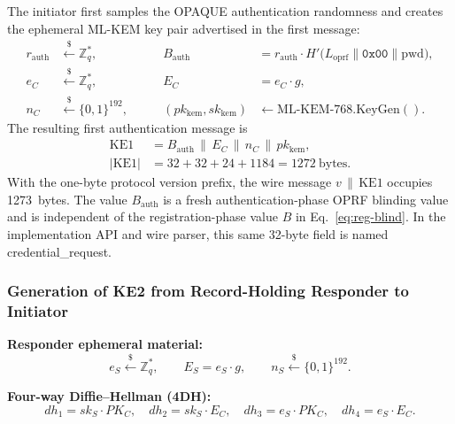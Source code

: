\documentclass[preprint,12pt]{elsarticle}
\newcommand{\Label}[1]{L_{\mathrm{#1}}}
\newcommand{\codeid}[1]{\textsf{#1}}
\theoremstyle{remark}
\begin{document}
The initiator first samples the OPAQUE authentication randomness and creates
the ephemeral ML-KEM key pair advertised in the first message:
\begin{equation}
  \label{eq:ke1-generation}
  \begin{alignedat}{2}
    r_{\mathrm{auth}} &\xleftarrow{\$} \mathbb{Z}_q^*,        &\qquad
    B_{\mathrm{auth}}
      &= r_{\mathrm{auth}} \cdot
        H'\!\bigl(\Label{oprf} \| \mathtt{0x00} \| \mathrm{pwd}\bigr),\\
    e_C &\xleftarrow{\$} \mathbb{Z}_q^*,        &\qquad
    E_C &= e_C \cdot g,\\
    n_C &\xleftarrow{\$} \{0,1\}^{192},         &\qquad
    (pk_{\mathrm{kem}},sk_{\mathrm{kem}})
        &\leftarrow \mathrm{ML\text{-}KEM\text{-}768.KeyGen}().
  \end{alignedat}
\end{equation}
The resulting first authentication message is
\begin{equation}
  \label{eq:ke1-wire-format}
  \begin{aligned}
    \mathrm{KE1}
      &= B_{\mathrm{auth}} \,\|\, E_C \,\|\, n_C \,\|\, pk_{\mathrm{kem}},\\
    |\mathrm{KE1}|
      &= 32 + 32 + 24 + 1184
       = 1272~\text{bytes}.
  \end{aligned}
\end{equation}
With the one-byte protocol version prefix, the wire message
$v \,\|\, \mathrm{KE1}$ occupies 1273~bytes.
The value $B_{\mathrm{auth}}$ is a fresh authentication-phase OPRF
blinding value and is independent of the registration-phase value $B$ in
Eq.~\eqref{eq:reg-blind}. In the implementation API and wire parser,
this same 32-byte field is named \codeid{credential\_request}.

\subsubsection{Generation of KE2 from Record-Holding Responder to Initiator}

\textbf{Responder ephemeral material:}
\begin{equation}
  \label{eq:ke2-ephemeral-generation}
  e_S \xleftarrow{\$} \mathbb{Z}_q^*,\qquad
  E_S = e_S \cdot g,\qquad
  n_S \xleftarrow{\$} \{0,1\}^{192}.
\end{equation}

\textbf{Four-way Diffie--Hellman (4DH):}
\begin{equation}
  dh_1 = sk_S \cdot PK_C,\quad
  dh_2 = sk_S \cdot E_C,\quad
  dh_3 = e_S \cdot PK_C,\quad
  dh_4 = e_S \cdot E_C.
\end{equation}
\end{document}
